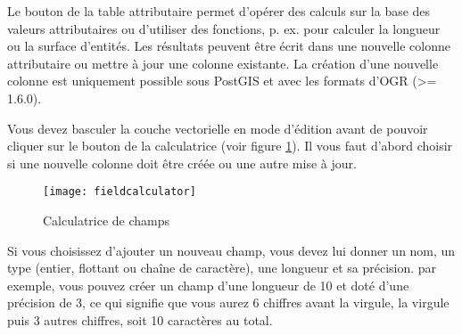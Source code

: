 Le bouton  de la table attributaire permet d'opérer des calculs sur la base des valeurs attributaires ou d'utiliser des fonctions, p. ex. pour calculer la longueur ou la surface d'entités. Les résultats peuvent être écrit dans une nouvelle colonne attributaire ou mettre à jour une colonne existante. La création d'une nouvelle colonne est uniquement possible sous PostGIS et avec les formats d'OGR (>= 1.6.0).

Vous devez basculer la couche vectorielle en mode d'édition avant de pouvoir cliquer sur le bouton de la calculatrice (voir figure \ref{fig:field_calculator}). Il vous faut d'abord choisir si une nouvelle colonne doit être créée ou une autre mise à jour.

\begin{figure}[ht]
  \centering
    \texttt{[image: fieldcalculator]}
    \caption{Calculatrice de champs \nixcaption}\label{fig:field_calculator}
\end{figure}

Si vous choisissez d'ajouter un nouveau champ, vous devez lui donner un nom, un type (entier, flottant ou chaîne de caractère), une longueur et sa précision. par exemple, vous pouvez créer un champ d'une longueur de 10 et doté d'une précision de 3, ce qui signifie que vous aurez 6 chiffres avant la virgule, la virgule puis 3 autres chiffres, soit 10 caractères au total.


